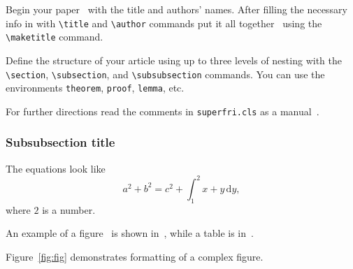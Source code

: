 \documentclass{superfri}
\begin{document}
Begin your paper~\cite{DBLP:series/cogtech/354089408} with the title and authors' names. After filling the
necessary info in with \verb=\title= and \verb=\author= commands put it all
together~\cite{SIV2008} using the \verb=\maketitle= command.

Define the structure of your article using up to three levels of nesting with
the \verb=\section=, \verb=\subsection=, and \verb=\subsubsection= commands.
You can use the environments \verb=theorem=, \verb=proof=, \verb=lemma=, etc.

For further directions read the comments in \verb=superfri.cls= as a manual~\cite{DBLP:journals/pcs/SokolinskyS16}.

\subsubsection{Subsubsection title}

The equations look like
\begin{equation}
a^2 + b^2 = c^2 + \int_1^2 x+y \, \mathrm{d}y,
\end{equation}
where $2$ is a number.

An example of a figure~\cite{DBLP:journals/corr/Zhang16b} is shown in~, while a table
is in~.

Figure~\ref{fig:fig} demonstrates formatting of a complex figure.

\end{document}
